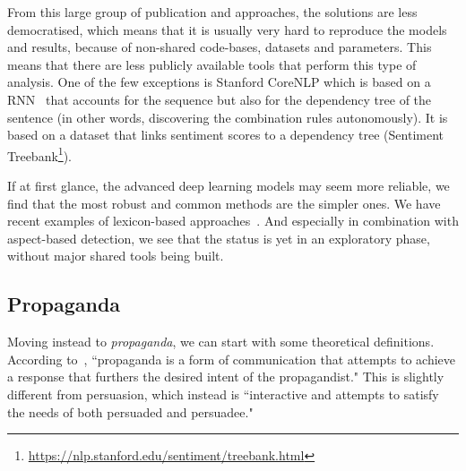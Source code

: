 
From this large group of publication and approaches, the solutions are less democratised, which means that it is usually very hard to reproduce the models and results, because of non-shared code-bases, datasets and parameters.
This means that there are less publicly available tools that perform this type of analysis.
One of the few exceptions is Stanford CoreNLP which is based on a RNN~\citep{socher2013recursive} that accounts for the sequence but also for the dependency tree of the sentence (in other words, discovering the combination rules autonomously). It is based on a dataset that links sentiment scores to a dependency tree (Sentiment Treebank\footnote{\url{https://nlp.stanford.edu/sentiment/treebank.html}}).

If at first glance, the advanced deep learning models may seem more reliable, we find that the most robust and common methods are the simpler ones.
We have recent examples of lexicon-based approaches~\citep{okango2022dictionary,mitra2020sentiment}.
And especially in combination with aspect-based detection, we see that the status is yet in an exploratory phase, without major shared tools being built.

\subsection{\statusorange Propaganda}
\label{sec:lit_propaganda}

Moving instead to \emph{propaganda}, we can start with some theoretical definitions.
According to~\cite{jowett2012propaganda}, ``propaganda  is  a  form  of  communication  that  attempts  to  achieve a  response  that  furthers  the  desired  intent  of  the  propagandist." This is slightly different from persuasion, which instead is ``interactive and attempts to satisfy the needs of both persuaded and persuadee."  %





